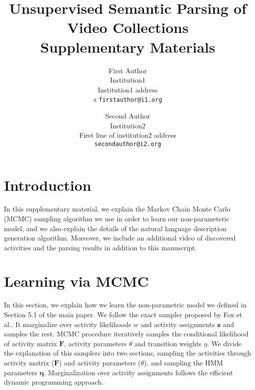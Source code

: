 \documentclass[10pt,twocolumn,letterpaper]{article}
\begin{document}
\title{Unsupervised Semantic Parsing of Video Collections \\ Supplementary Materials}



\author{First Author\\
Institution1\\
Institution1 address\\z
{\tt\small firstauthor@i1.org}
\and
Second Author\\
Institution2\\
First line of institution2 address\\
{\tt\small secondauthor@i2.org}
}

\maketitle

\section{Introduction}
In this supplementary material, we explain the Markov Chain Monte Carlo (MCMC) sampling algorithm we use in order to learn our non-parameteric model, and we also explain the details of the natural language description generation algorithm. Moreover, we include an additional video of discovered activities and the parsing results in addition to this manuscript.

\section{Learning via MCMC}
In this section, we explain how we learn the non-parametric model we defined in Section 5.1 of the main paper. We follow the exact sampler proposed by Fox et al.\cite{foxBPHMM}. It marginalize over activity likelihoods $w$ and activity assignments $\mathbf{z}$ and samples the rest. MCMC procedure iteratively samples the conditional likelihood of activity matrix $\mathbf{F}$, activity parameters $\theta$ and transition weights $\eta$. We divide the explanation of this samplers into two sections, sampling the activities through activity matrix ($\mathbf{F}$) and activity parameters ($\theta$), and sampling the HMM parameters $\mathbf{\eta}$. Marginalization over activity assignments follows the efficient dynamic programming approach.
\end{document}
